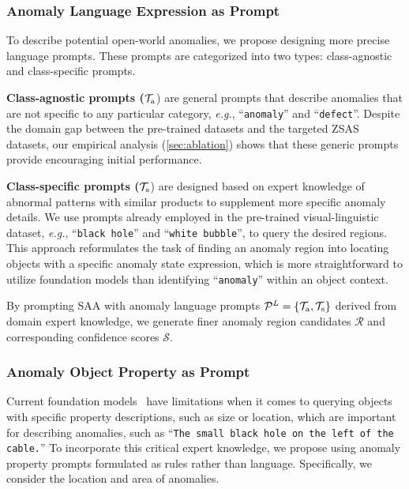 \documentclass{article}
\begin{document}
\subsubsection{Anomaly Language Expression as Prompt}

To describe potential open-world anomalies, we propose designing more precise language prompts. These prompts are categorized into two types: class-agnostic and class-specific prompts. 

\noindent \textbf{Class-agnostic prompts ($\mathcal{T}_{\rm a}$}) are general prompts that describe anomalies that are not specific to any particular category, \textit{e.g.}, ``\verb|anomaly|'' and ``\verb|defect|''. Despite the domain gap between the pre-trained datasets and the targeted ZSAS datasets, our empirical analysis (\ref{sec:ablation}) shows that these generic prompts provide  encouraging initial performance.

\noindent \textbf{Class-specific prompts ($\mathcal{T}_{\rm s}$}) are designed based on expert knowledge of abnormal patterns with similar products to supplement more specific anomaly details.
We use prompts already employed in the pre-trained visual-linguistic dataset, \textit{e.g.}, ``\verb|black hole|'' and ``\verb|white bubble|'', to query the desired regions. This approach reformulates the task of finding an anomaly region into locating objects with a specific anomaly state expression, which is more straightforward to utilize foundation models than identifying ``\verb|anomaly|'' within an object context.

By prompting SAA with anomaly language prompts $\mathcal{P}^L=\{ \mathcal{T}_{\rm a}, \mathcal{T}_ {\rm s}   \}$ derived from domain expert knowledge, we generate finer anomaly region candidates $\mathcal{R}$ and corresponding confidence scores $\mathcal{S}$. 




\subsubsection{Anomaly Object Property as Prompt}

Current foundation models~\cite{liu2023grounding, li2021grounded} have limitations when it comes to querying objects with specific property descriptions, such as size or location, which are important for describing anomalies, such as ``\verb|The small black hole on the left of the cable.|'' To incorporate this critical expert knowledge, we propose using anomaly property prompts formulated as rules rather than language. Specifically, we consider the location and area of anomalies.
\end{document}
